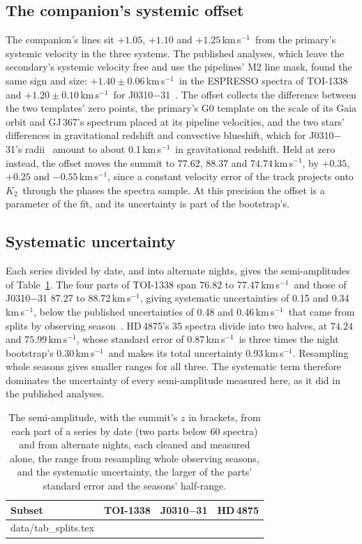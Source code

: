 \documentclass[3p,11pt]{elsarticle}
\makeatletter
\newcommand{\tabinput}[1]{\@@input #1 }
\newcommand{\kms}{km\,s$^{-1}$}
\newcommand{\Ktwo}{$K_2$}
\makeatother
\begin{document}
\subsection{The companion's systemic offset}

The companion's lines sit $+1.05$, $+1.10$ and $+1.25$\,\kms\ from the primary's systemic velocity
in the three systems. The published analyses, which leave the secondary's systemic velocity free
and use the pipelines' M2 line mask, found the same sign and size: $+1.40 \pm 0.06$\,\kms\ in the
ESPRESSO spectra of TOI-1338~\cite{Sebastian2024b} and $+1.20 \pm 0.10$\,\kms\ for
J0310$-$31~\cite{Stevenson2026}. The offset collects the difference between the two templates'
zero points, the primary's G0 template on the scale of its Gaia orbit and GJ\,367's spectrum placed
at its pipeline velocities, and the two stars' differences in gravitational redshift and convective
blueshift, which for J0310$-$31's radii~\cite{Stevenson2026} amount to about 0.1\,\kms\ in
gravitational redshift. Held at zero instead, the offset moves the summit to $77.62$, $88.37$ and
$74.74$\,\kms, by $+0.35$, $+0.25$ and $-0.55$\,\kms, since a constant velocity error of the track
projects onto \Ktwo\ through the phases the spectra sample. At this precision the offset is a
parameter of the fit, and its uncertainty is part of the bootstrap's.

\subsection{Systematic uncertainty}

Each series divided by date, and into alternate nights, gives the semi-amplitudes of
Table~\ref{tab:splits}. The four parts of TOI-1338 span 76.82 to 77.47\,\kms\ and those of
J0310$-$31 87.27 to 88.72\,\kms, giving systematic uncertainties of 0.15 and 0.34\,\kms, below
the published uncertainties of 0.48 and 0.46\,\kms\ that came from splits by observing
season~\cite{Sebastian2024b,Stevenson2026}. HD\,4875's 35 spectra divide into two halves, at
$74.24$ and $75.99$\,\kms, whose standard error of 0.87\,\kms\ is three times the night bootstrap's
0.30\,\kms\ and makes its total uncertainty 0.93\,\kms. Resampling whole seasons gives smaller
ranges for all three. The systematic term therefore dominates the uncertainty of every
semi-amplitude measured here, as it did in the published analyses.

\begin{table}[t]
\centering
\caption{The semi-amplitude, with the summit's $z$ in brackets, from each part of a series by date
(two parts below 60 spectra) and from alternate nights, each cleaned and measured alone, the range
from resampling whole observing seasons, and the systematic uncertainty, the larger of the parts'
standard error and the seasons' half-range.}\label{tab:splits}
\begin{tabular}{lccc}
\toprule
Subset & TOI-1338 & J0310$-$31 & HD\,4875\\
\midrule
\tabinput{data/tab_splits.tex}
\bottomrule
\end{tabular}
\end{table}
\end{document}
